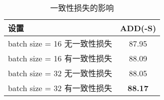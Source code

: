 \begin{table}[htbp]
    \centering
    \caption{一致性损失的影响}
    \begin{tabular}{lc}
    \toprule 
    设置 & ADD(-S) \\
    \midrule
    batch size = 16 无一致性损失 & 87.95 \\
    batch size = 16 有一致性损失 & 88.09 \\
    \midrule
    batch size = 32 无一致性损失 & 88.05 \\
    batch size = 32 有一致性损失 & \textbf{88.17} \\
    \bottomrule
  \end{tabular}
  \label{tab:consistent_loss}
\end{table}